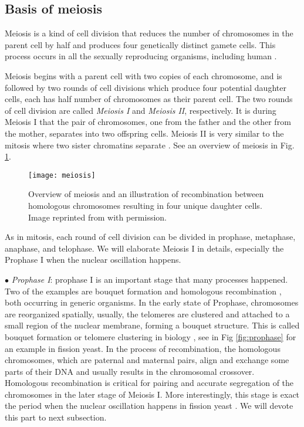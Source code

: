 \subsection{Basis of meiosis}
\label{sub:basis_of_meiosis}

Meiosis is a kind of cell division that reduces the number of chromosomes in the parent cell by half and produces four genetically distinct gamete cells. This process occurs in all the sexually reproducing organisms, including human \cite{Freeman2008}. 

Meiosis begins with a parent cell with two copies of each chromosome, and is followed by two rounds of cell divisions which produce four potential daughter cells, each has half number of chromosomes as their parent cell. The two rounds of cell division are called \emph{Meiosis I} and \emph{Meiosis II}, respectively. It is during Meiosis I that the pair of chromosomes, one from the father and the other from the mother, separates into two offspring cells. Meiosis II is very similar to the mitosis where two sister chromatins separate \cite{Freeman2008,Villeneuve2001a}. See an overview of meiosis in Fig. \ref{fig:meiosis}.

\begin{figure}[htpb]
    \centering
    \texttt{[image: meiosis]}
    \caption{Overview of meiosis and an illustration of recombination between homologous chromosomes resulting in four unique daughter cells. Image reprinted from \cite{} with permission.}
    \label{fig:meiosis}
\end{figure}

As in mitosis, each round of cell division can be divided in prophase, metaphase, anaphase, and telophase. We will elaborate Meiosis I in details, especially the Prophase I when the nuclear oscillation happens. 

$\bullet$ \emph{Prophase I}: prophase I is an important stage that many processes happened. Two of the examples are bouquet formation \cite{Wegener1980a} and homologous recombination \cite{Davis2001,Gerton2005}, both occurring in generic organisms. In the early state of Prophase, chromosomes are reorganized spatially, usually, the telomeres are clustered and attached to a small region of the nuclear membrane, forming a bouquet structure. This is called bouquet formation or telomere clustering in biology \cite{Chikashige1994,Wegener1980a,Niwa2000}, see in Fig \ref{fig:prophase} for an example in fission yeast. In the process of recombination, the homologous chromosomes, which are paternal and maternal pairs, align and exchange some parts of their DNA and usually results in the chromosomal crossover. Homologous recombination is critical for pairing and accurate segregation of the chromosomes in the later stage of Meiosis I. More interestingly, this stage is exact the period when the nuclear oscillation happens in fission yeast \cite{Ding1998,Wells2006}. We will devote this part to next subsection.

